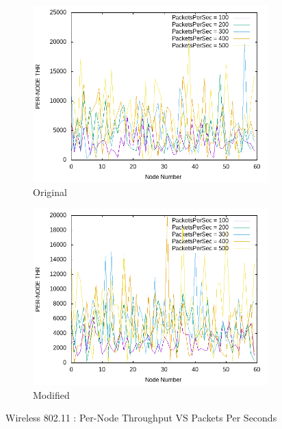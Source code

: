     \begin{figure}[!h] 
    	\centering
    	
    	\begin{subfigure}{0.9\textwidth} %
    		\includegraphics[width=.98\textwidth]{Pictures/Wireless802.11Mobile/Original/PER-NODETHRVSPacketsPerSec.png}
    		 \caption{Original} %
    	\end{subfigure}
    	
    	\vspace{1em} %
    	
    	\begin{subfigure}{0.9\textwidth} %
    		\includegraphics[width=.98\textwidth]{Pictures/Wireless802.11Mobile/Modified/PER-NODETHRVSPacketsPerSec.png}
    		 \caption{ Modified} %
    	\end{subfigure}
    	
    	 \caption{Wireless 802.11 : Per-Node Throughput VS Packets Per Seconds} %
    \end{figure}
    
